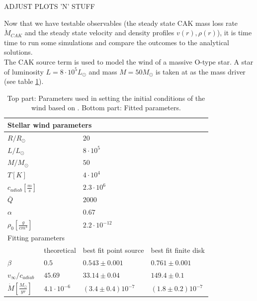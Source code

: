 ADJUST PLOTS 'N' STUFF


Now that we have testable observables (the steady state CAK mass loss rate $\dot{M}_{CAK}$ and the steady state velocity and density profiles $v(r), \rho(r)$), it is time time to run some simulations and compare the outcomes to the analytical solutions.\\

The CAK source term is used to model the wind of a massive O-type star. A star of luminosity $L = 8\cdot 10^5 L_\odot$ and mass $M = 50 M_\odot$ is taken at as the mass driver (see table \ref{tab: CAK_res}). \\

\begin{table}[]
\centering
\caption{Top part: Parameters used in setting the initial conditions of the wind based on \citep{Sundqvist2013}. Bottom part: Fitted parameters.}
\label{tab: CAK_res}
\begin{tabular}{llll}
\hline
\hline
\multicolumn{4}{l}{Stellar wind parameters}                                           \\
\hline
$R/R_\odot$              &             & $20$ &\\
$L/L_\odot$              &             &  $8\cdot10^{5}$  &\\
$M/M_\odot$              &             & $50$ &\\
$T[K]$                   &             & $4\cdot10^{4}$ &\\
$c_{adiab}[\frac{m}{s}]$ &             & $2.3\cdot 10^{6}$ &\\
$\bar{Q}$ 				 &             & $2000$ &\\
$\alpha$                 &             & $0.67$ &\\
$\rho_0[\frac{g}{cm^3}]$ &             & $2.2\cdot 10^{-12}$ &\\
\hline
\hline
\multicolumn{4}{l}{Fitting parameters}                                                \\
                         & theoretical & best fit point source & best fit finite disk \\
\hline
$\beta$                  & $0.5$       & $0.543\pm 0.001$      &  $0.761 \pm 0.001$   \\
$v_{\infty}/c_{adiab}$   & $45.69$     & $33.14\pm 0.04$       &  $149.4 \pm 0.1$     \\
$\dot{M}[\frac{M_\odot}{yr}]$ & $4.1 \cdot 10^{-6}$  & $(3.4 \pm 0.4)10^{-7}$&  $(1.8\pm0.2)10^{-7}$ \\           
\end{tabular}
\end{table}




